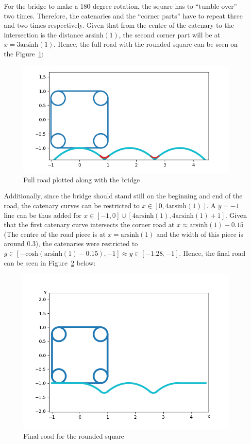 \documentclass[12pt]{article}
\begin{document}
        For the bridge to make a 180 degree rotation, the square has to ``tumble over'' two times. Therefore, the catenaries and the ``corner parts'' have to repeat three and two times respectively. Given that from the centre of the catenary to the intersection is the distance $\text{arsinh}(1)$, the second corner part will be at $x=3\text{arsinh}(1)$. Hence, the full road with the rounded square can be seen on the Figure~\ref{fig:bridge_full}:
        \begin{figure}[H]
            \centering
            \includegraphics[width=0.75\linewidth]{images/road_with_square.png}
            \caption{Full road plotted along with the bridge}\label{fig:bridge_full}
        \end{figure}

        Additionally, since the bridge should stand still on the beginning and end of the road, the catenary curves can be restricted to $x \in [0, 4\text{arsinh}(1)]$. A $y=-1$ line can be thus added for $x \in [-1, 0] \cup [4\text{arsinh}(1), 4\text{arsinh}(1)+1]$. Given that the first catenary curve intersects the corner road at $x \approx \text{arsinh}(1) - 0.15$ (The centre of the road piece is at $x=\text{arsinh}(1)$ and the width of this piece is around $0.3$), the catenaries were restricted to $y\in [-\text{cosh}(\text{arsinh}(1) - 0.15), -1] \approx y \in [-1.28, -1]$. Hence, the final road can be seen in Figure~\ref{fig:bridge_final} below:

        \begin{figure}[H]
            \centering
            \includegraphics[width=0.9\linewidth]{images/road_square_final.png}
            \caption{Final road for the rounded square}\label{fig:bridge_final}
        \end{figure}
\end{document}
